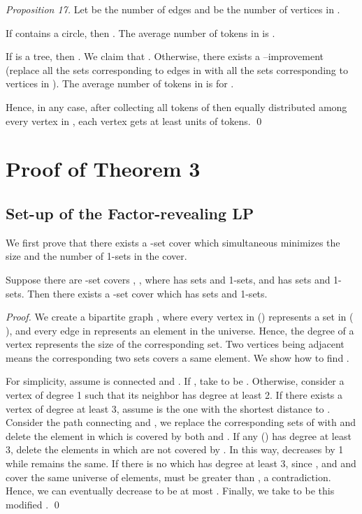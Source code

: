 \documentclass[runningheads,a4paper]{llncs}
\numberwithin{equation}{section}
\begin{document}
\begin{proof}[Proposition 17]
Let  be the number of edges and  be the number of vertices in .

If  contains a circle, then . The average number of tokens in  is .

If  is a tree, then . We claim that . Otherwise, there exists a --improvement (replace all the sets corresponding to edges in  with all the sets corresponding to vertices in ). The average number of tokens in  is  for .

Hence, in any case, after collecting all tokens of  then equally distributed among every vertex in , each vertex gets at least  units of tokens.  \qed
\end{proof}


\section{Proof of Theorem 3}

\subsection{Set-up of the Factor-revealing LP}

We first prove that there exists a -set cover which simultaneous minimizes the size and the number of 1-sets in the cover.
\begin{lemma}
Suppose there are -set covers , , where  has  sets and  1-sets, and  has  sets and  1-sets. Then there exists a -set cover  which has  sets and  1-sets.
\end{lemma}

\begin{proof}
We create a bipartite graph , where every vertex in () represents a set in ( ), and every edge in  represents an element in the universe. Hence, the degree of a vertex represents the size of the corresponding set. Two vertices being adjacent means the corresponding two sets covers a same element. We show how to find .
 
For simplicity, assume  is connected and . If , take  to be . Otherwise, consider a vertex  of degree 1 such that its neighbor has degree at least 2. If there exists a vertex  of degree at least 3, assume  is the one with the shortest distance to . Consider the path  connecting  and , we replace the corresponding sets of  with  and delete the element in  which is covered by both  and . If any  () has degree at least 3, delete the elements in  which are not covered by . In this way,  decreases by 1 while  remains the same. If there is no  which has degree at least 3, since , and  and  cover the same universe of elements,  must be greater than , a contradiction. Hence, we can eventually decrease  to be at most . Finally, we take  to be this modified . \qed

\end{proof}
\end{document}
